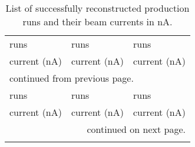 \begin{center}
\begin{singlespacing}
\begin{longtable}{lr|lr|lr}
\caption[Production Run List]{\label{tab:data.prodruns}List of successfully reconstructed production runs and their beam currents in nA.} \\

\hline \hline
\multicolumn{2}{l|}{runs} & \multicolumn{2}{l|}{runs} & \multicolumn{2}{l}{runs} \\
\multicolumn{2}{r|}{current (nA)} & \multicolumn{2}{r|}{current (nA)} & \multicolumn{2}{r}{current (nA)} \\
\hline
\endfirsthead

\multicolumn{6}{l}{\scriptsize continued from previous page.} \\
\hline
\multicolumn{2}{l|}{runs} & \multicolumn{2}{l|}{runs} & \multicolumn{2}{l}{runs} \\
\multicolumn{2}{r|}{current (nA)} & \multicolumn{2}{r|}{current (nA)} & \multicolumn{2}{r}{current (nA)} \\
\hline
\endhead

\hline
\multicolumn{6}{r}{\scriptsize continued on next page.} \\
\endfoot

\hline \hline
\endlastfoot


\end{longtable}
\end{singlespacing}
\end{center}
